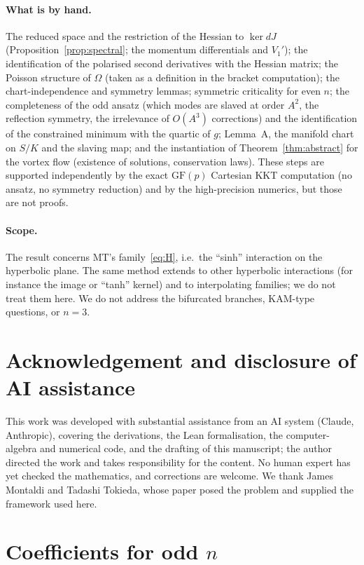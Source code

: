 \documentclass[11pt]{article}
\numberwithin{equation}{section}
\theoremstyle{definition}
\theoremstyle{remark}
\begin{document}
\paragraph{What is by hand.} The reduced space and the restriction of the Hessian to $\ker dJ$
(Proposition~\ref{prop:spectral}; the momentum differentials and $V_1'$); the identification of the
polarised second derivatives with the Hessian matrix; the Poisson structure of $\Omega$ (taken as a
definition in the bracket computation); the chart-independence and symmetry lemmas; symmetric criticality
for even $n$; the completeness of the odd ansatz (which modes are slaved at order $A^2$, the reflection
symmetry, the irrelevance of $O(A^3)$ corrections) and the identification of the constrained minimum with
the quartic of $g$; Lemma~A, the manifold chart on $S/K$ and the slaving map; and the instantiation of
Theorem~\ref{thm:abstract} for the vortex flow (existence of solutions, conservation laws). These
steps are supported independently by the exact $\mathrm{GF}(p)$ Cartesian KKT computation (no ansatz, no
symmetry reduction) and by the high-precision numerics, but those are not proofs.

\paragraph{Scope.} The result concerns MT's family~\eqref{eq:H}, i.e.\ the ``sinh'' interaction on the
hyperbolic plane. The same method extends to other hyperbolic interactions (for instance the
image or ``tanh'' kernel) and to interpolating families; we do not treat them here. We do not address the
bifurcated branches, KAM-type questions, or $n=3$.

\section*{Acknowledgement and disclosure of AI assistance}
This work was developed with substantial assistance from an AI system (Claude, Anthropic), covering the
derivations, the Lean formalisation, the computer-algebra and numerical code, and the drafting of this
manuscript; the author directed the work and takes responsibility for the content. No human expert has yet
checked the mathematics, and corrections are welcome. We thank James Montaldi and Tadashi Tokieda, whose
paper posed the problem and supplied the framework used here.

\appendix
\section{Coefficients for odd \texorpdfstring{$n$}{n}}\label{app:odd}
\end{document}
